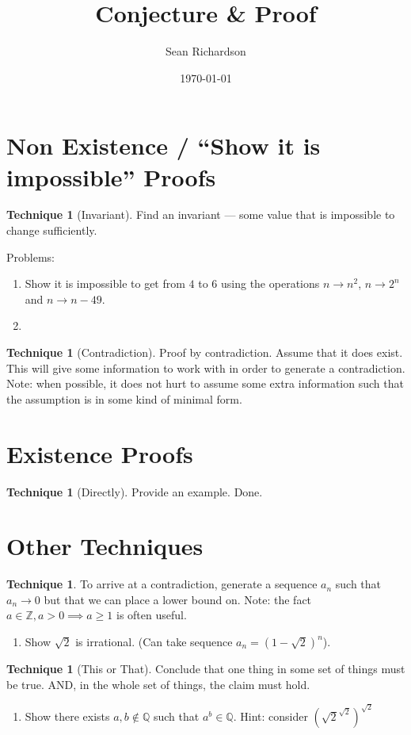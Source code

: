 \documentclass[12pt]{amsart}
\theoremstyle{definition}
\newtheorem{technique}[theorem]{Technique}
\begin{document}
\title{Conjecture \& Proof}
\author{Sean Richardson}
\date{\today}
\maketitle


\section{Non Existence / ``Show it is impossible'' Proofs}
\begin{technique}[Invariant]
Find an invariant --- some value that is impossible to change
        sufficiently.    
\end{technique}
Problems:
\begin{enumerate}
    \item Show it is impossible to get from $4$ to $6$ using the operations $n \rightarrow
        n^2$, $n \rightarrow 2^n$ and $n \rightarrow n-49$.
    \item 
\end{enumerate}
\begin{technique}[Contradiction]
    Proof by contradiction. Assume that it does exist. This will give some
    information to work with in order to generate a contradiction. 
    \\Note: when possible, it does not hurt to assume some extra
    information such that the assumption is in some kind of minimal form. 
\end{technique}
\section{Existence Proofs}
\begin{technique}[Directly]
    Provide an example. Done.
\end{technique}


\section{Other Techniques}
\begin{technique}
    To arrive at a contradiction, generate a sequence $a_n$ such that $a_n
    \rightarrow 0$ but that we can place a lower bound on. Note: the fact
    $a \in \mathbb{Z}, a > 0 \implies a \geq 1$ is often useful.
\end{technique}
\begin{enumerate}
    \item Show $\sqrt{2}$ is irrational. (Can take sequence $a_n =
        (1-\sqrt{2})^n$).
\end{enumerate}

\begin{technique}[This or That]
    Conclude that one thing in some set of things must be true. AND, in the
    whole set of things, the claim must hold.
\end{technique}
\begin{enumerate}
    \item Show there exists $a,b \notin \mathbb{Q}$ such that $a^b \in
        \mathbb{Q}$. Hint: consider ${\left(
        \sqrt{2}^\sqrt{2}\right)}^\sqrt{2}$
\end{enumerate}
\end{document}
